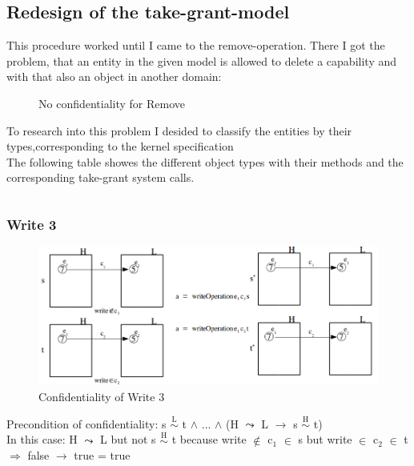 \documentclass[pdftex,11pt,a4paper]{article}
\begin{document}
\subsection{Redesign of the take-grant-model}
This procedure worked until I came to the remove-operation. There I got the problem, that an entity in the given model is allowed to delete a capability and with that also an object in another domain:
\begin{figure}[H]
\caption{No confidentiality for Remove}
\end{figure}
To research into this problem I desided to classify the entities by their types,corresponding to the kernel specification \\ %
The following table showes the different object types with their methods and the corresponding take-grant system calls. 
\begin{tabular}{l}

\end{tabular}
\subsubsection{Write 3}\label{sec:Write 3}
\begin{figure}[H]
	\includegraphics[width=1.1\textwidth]{./Pictures/write3Confidentality.png}
		\caption[Confidentiality of Write 3]{Confidentiality of Write 3}
	\label{fig:write3}
\end{figure}
Precondition of confidentiality: 	s $\overset{\text{L}}{\sim}$ t $\wedge$ ... $\wedge$ (H  $\leadsto$ L $\rightarrow$ s $\overset{\text{H}}{\sim}$ t) \\
In this case: H  $\leadsto$ L but not s $\overset{\text{H}}{\sim}$ t because write $\notin$ c$_1$ $\in$ s but write $\in$ c$_2$ $\in$ t \\
$\Rightarrow$ false $\rightarrow$ true = true
\end{document}
